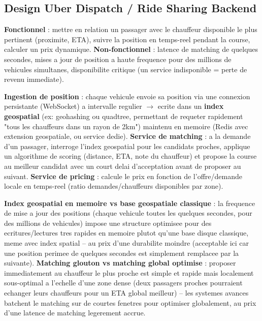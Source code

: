 \documentclass[11pt,a4paper]{article}
\newenvironment{sujet}[1]{%
  \subsection{#1}
}{%
  \bigskip
}
\begin{document}
\begin{sujet}{Design Uber Dispatch / Ride Sharing Backend}

\begin{req}
\textbf{Fonctionnel} : mettre en relation un passager avec le chauffeur disponible le plus pertinent (proximite, ETA), suivre la position en temps-reel pendant la course, calculer un prix dynamique. \textbf{Non-fonctionnel} : latence de matching de quelques secondes, mises a jour de position a haute frequence pour des millions de vehicules simultanes, disponibilite critique (un service indisponible = perte de revenu immediate).
\end{req}

\begin{archbox}
\textbf{Ingestion de position} : chaque vehicule envoie sa position via une connexion persistante (WebSocket) a intervalle regulier $\to$ ecrite dans un \textbf{index geospatial} (ex: geohashing ou quadtree, permettant de requeter rapidement "tous les chauffeurs dans un rayon de 2km") maintenu en memoire (Redis avec extension geospatiale, ou service dedie). \textbf{Service de matching} : a la demande d'un passager, interroge l'index geospatial pour les candidats proches, applique un algorithme de scoring (distance, ETA, note du chauffeur) et propose la course au meilleur candidat avec un court delai d'acceptation avant de proposer au suivant. \textbf{Service de pricing} : calcule le prix en fonction de l'offre/demande locale en temps-reel (ratio demandes/chauffeurs disponibles par zone).
\end{archbox}

\begin{tradeoff}
\textbf{Index geospatial en memoire vs base geospatiale classique} : la frequence de mise a jour des positions (chaque vehicule toutes les quelques secondes, pour des millions de vehicules) impose une structure optimisee pour des ecritures/lectures tres rapides en memoire plutot qu'une base disque classique, meme avec index spatial -- au prix d'une durabilite moindre (acceptable ici car une position perimee de quelques secondes est simplement remplacee par la suivante). \textbf{Matching glouton vs matching global optimise} : proposer immediatement au chauffeur le plus proche est simple et rapide mais localement sous-optimal a l'echelle d'une zone dense (deux passagers proches pourraient echanger leurs chauffeurs pour un ETA global meilleur) -- les systemes avances batchent le matching sur de courtes fenetres pour optimiser globalement, au prix d'une latence de matching legerement accrue.
\end{tradeoff}

\end{sujet}
\end{document}
